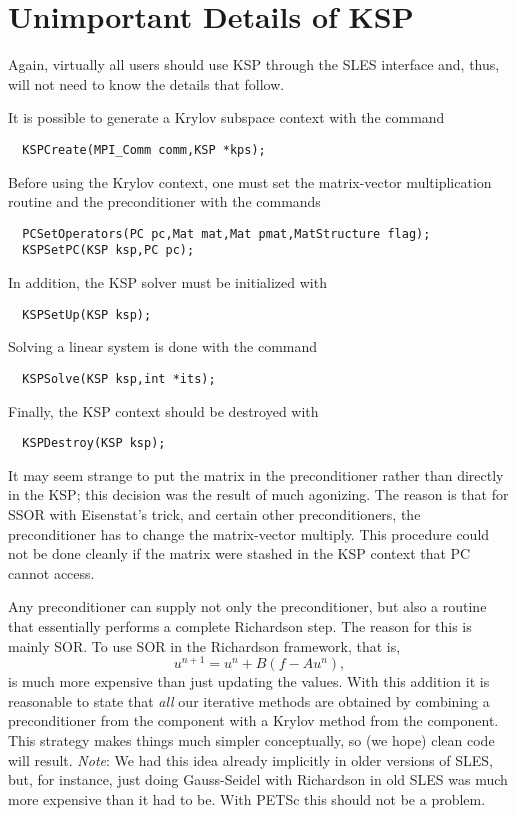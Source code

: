 \section{Unimportant Details of KSP}

Again, virtually all users should use KSP through the SLES interface
and, thus, will not need to know the details that follow. 

It is possible to generate a Krylov subspace context with the 
command 
\begin{verbatim}
  KSPCreate(MPI_Comm comm,KSP *kps);
\end{verbatim}
Before using the Krylov context, one must set the matrix-vector multiplication routine and
the preconditioner with the 
commands  
\begin{verbatim}
  PCSetOperators(PC pc,Mat mat,Mat pmat,MatStructure flag);
  KSPSetPC(KSP ksp,PC pc);
\end{verbatim}
In addition, the KSP solver must be initialized with 
\begin{verbatim}
  KSPSetUp(KSP ksp);
\end{verbatim}
Solving a linear system is done with the command 
\begin{verbatim}
  KSPSolve(KSP ksp,int *its);
\end{verbatim}
Finally, the KSP context should be destroyed with 
\begin{verbatim}
  KSPDestroy(KSP ksp);
\end{verbatim}

It may seem strange to put the matrix in the preconditioner rather
than directly in the KSP; this decision was the result of much
agonizing. The reason is that for SSOR with Eisenstat's trick, and 
certain other preconditioners, the
preconditioner has to change the matrix-vector multiply.  This 
procedure could not
be done cleanly if the matrix were stashed in the KSP context that
PC cannot access.

Any preconditioner can supply not 
only the preconditioner, but also a routine that essentially performs a
complete Richardson step. The reason for this is mainly SOR. To 
use SOR in the Richardson framework, that is,
\[
  u^{n+1} = u^{n} + B(f - A u^{n}), 
\]
is much more expensive than just updating the values.
With this addition it is reasonable to state that {\em all} our
iterative methods are obtained by combining a preconditioner from 
the  component with a Krylov method from the 
component. This strategy makes things much simpler conceptually, so 
(we hope)
clean code will result. {\em Note}: We had this idea already implicitly in 
older versions of SLES, but, for instance, just doing Gauss-Seidel
with Richardson in old SLES was much more expensive than it had to be. 
With PETSc this should not be a problem. 

